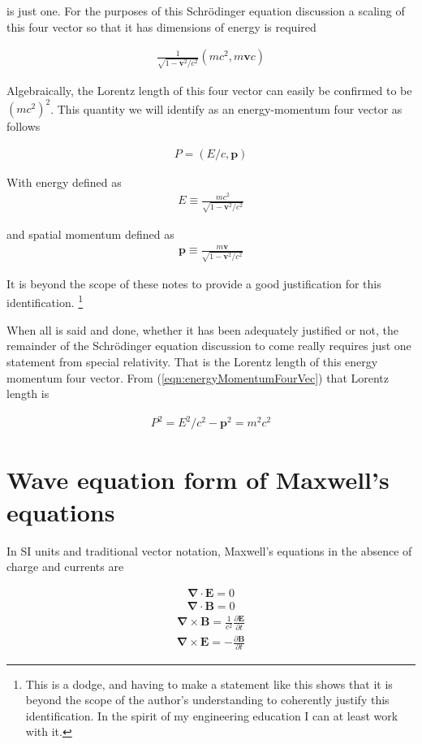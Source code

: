 \documentclass[]{eliblog}
\newcommand{\BB}[0]{\mathbf{B}}
\newcommand{\BE}[0]{\mathbf{E}}
\newcommand{\Bp}[0]{\mathbf{p}}
\newcommand{\Bv}[0]{\mathbf{v}}
\newcommand{\cross}[0]{\times}
\newcommand{\spacegrad}[0]{\boldsymbol{\nabla}}
\newcommand{\inv}[1]{\frac{1}{#1}}
\begin{document}
is just one.  For the purposes of this 
Schr\"{o}dinger equation
discussion a scaling of this four vector so that it has dimensions of energy is required

\begin{align}
\frac{1}{\sqrt{1 - \Bv^2/c^2}}(m c^2, m\Bv c)
\end{align}

Algebraically, the Lorentz length of this four vector can easily be confirmed to be $(m c^2)^2$.  This quantity 
we will identify as an energy-momentum four vector as follows

\begin{align}\label{eqn:energyMomentumFourVec}
P = (E/c, \Bp)
\end{align}

With energy defined as
\begin{align}
E \equiv \frac{m c^2}{\sqrt{1 - \Bv^2/c^2}}
\end{align}

and spatial momentum defined as
\begin{align}
\Bp \equiv \frac{m \Bv}{\sqrt{1 - \Bv^2/c^2}}
\end{align}

It is beyond the scope of these notes to provide a good justification for this identification.
\footnote{This is a dodge, and having to make a statement like this shows that it is beyond the scope of the author's understanding to coherently justify this identification.  In the spirit of my engineering education I can at least work with it.}

When all is said and done, whether it has been adequately justified or not, the remainder
of the 
Schr\"{o}dinger equation
discussion to come really requires just one statement from special relativity.  That is
the Lorentz length of this energy momentum four vector.
From (\ref{eqn:energyMomentumFourVec}) that Lorentz length is

\begin{align}
P^2 = E^2/c^2 - \Bp^2 = m^2 c^2
\end{align}

\section{Wave equation form of Maxwell's equations}

In SI units and traditional vector notation, Maxwell's equations in the absence of charge and currents are

\begin{align}\label{eqn:divE}
\spacegrad \cdot \BE = 0
\end{align}
\begin{align}\label{eqn:divB}
\spacegrad \cdot \BB = 0
\end{align}
\begin{align}\label{eqn:curlB}
\spacegrad \cross \BB = \inv{c^2} \frac{\partial \BE}{\partial t}
\end{align}
\begin{align}\label{eqn:curlE}
\spacegrad \cross \BE = -\frac{\partial \BB}{\partial t}
\end{align}
\end{document}
